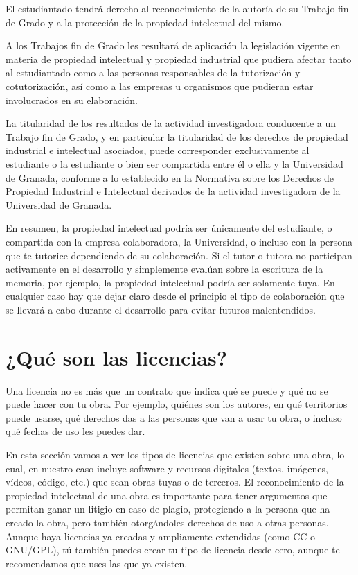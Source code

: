 \begin{enumerate}
\begin{it}
    \item El estudiantado tendrá derecho al reconocimiento de la autoría de su Trabajo
fin de Grado y a la protección de la propiedad intelectual del mismo.
\item A los Trabajos fin de Grado les resultará de aplicación la legislación vigente en
materia de propiedad intelectual y propiedad industrial que pudiera afectar
tanto al estudiantado como a las personas responsables de la tutorización y
cotutorización, así como a las empresas u organismos que pudieran estar
involucrados en su elaboración.
\item La titularidad de los resultados de la actividad investigadora conducente a un
Trabajo fin de Grado, y en particular la titularidad de los derechos de
propiedad industrial e intelectual asociados, puede corresponder
exclusivamente al estudiante o la estudiante o bien ser compartida entre él o
ella y la Universidad de Granada, conforme a lo establecido en la Normativa
sobre los Derechos de Propiedad Industrial e Intelectual derivados de la
actividad investigadora de la Universidad de Granada.
\end{it}
\end{enumerate}

En resumen, la propiedad intelectual podría ser únicamente del estudiante, o compartida con la empresa colaboradora, la Universidad, o incluso con la persona que te tutorice dependiendo de su colaboración. Si el tutor o tutora no participan activamente en el desarrollo y simplemente evalúan sobre la escritura de la memoria, por ejemplo, la propiedad intelectual podría ser solamente tuya. En cualquier caso hay que dejar claro desde el principio el tipo de colaboración que se llevará a cabo durante el desarrollo para evitar futuros malentendidos. 


\section{¿Qué son las licencias?}

Una licencia no es más que un contrato que indica qué se puede y qué no se puede hacer con tu obra. Por ejemplo, quiénes son los autores, en qué territorios puede usarse, qué derechos das a las personas que van a usar tu obra, o incluso qué fechas de uso les puedes dar. 

En esta sección vamos a ver los tipos de licencias que existen sobre una obra, lo cual, en nuestro caso incluye software y recursos digitales (textos, imágenes, vídeos, código, etc.) que sean obras tuyas o de terceros. El reconocimiento de la propiedad intelectual de una obra es importante para tener argumentos que permitan ganar un litigio en caso de plagio, protegiendo a la persona que ha creado la obra, pero también otorgándoles derechos de uso a otras personas. Aunque haya licencias ya creadas y ampliamente extendidas (como CC o GNU/GPL), tú también puedes crear tu tipo de licencia desde cero, aunque te recomendamos que uses las que ya existen.

